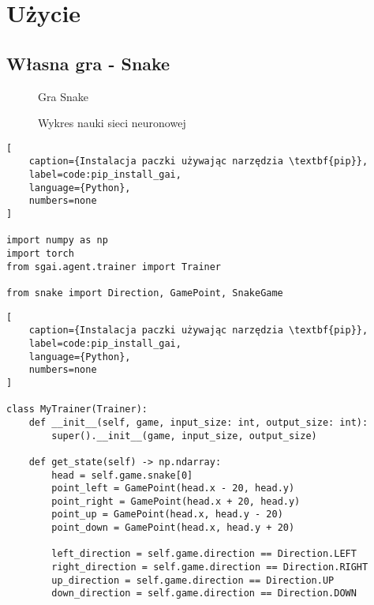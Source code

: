 \section{Użycie}



\subsection{Własna gra - Snake}



\begin{figure}[h]
    \centering
    \caption{Gra Snake}
    \label{img:snake_game}
\end{figure}


\begin{figure}[h]
    \centering
    \caption{Wykres nauki sieci neuronowej}
    \label{img:ai_graph}
\end{figure}



\begin{onepage}
    \begin{lstlisting}[
    caption={Instalacja paczki używając narzędzia \textbf{pip}},
    label=code:pip_install_gai,
    language={Python},
    numbers=none
]

import numpy as np
import torch
from sgai.agent.trainer import Trainer

from snake import Direction, GamePoint, SnakeGame
\end{lstlisting}
\end{onepage}



\begin{onepage}
    \begin{lstlisting}[
    caption={Instalacja paczki używając narzędzia \textbf{pip}},
    label=code:pip_install_gai,
    language={Python},
    numbers=none
]

class MyTrainer(Trainer):
    def __init__(self, game, input_size: int, output_size: int):
        super().__init__(game, input_size, output_size)

    def get_state(self) -> np.ndarray:
        head = self.game.snake[0]
        point_left = GamePoint(head.x - 20, head.y)
        point_right = GamePoint(head.x + 20, head.y)
        point_up = GamePoint(head.x, head.y - 20)
        point_down = GamePoint(head.x, head.y + 20)

        left_direction = self.game.direction == Direction.LEFT
        right_direction = self.game.direction == Direction.RIGHT
        up_direction = self.game.direction == Direction.UP
        down_direction = self.game.direction == Direction.DOWN
    \end{lstlisting}
\end{onepage}



